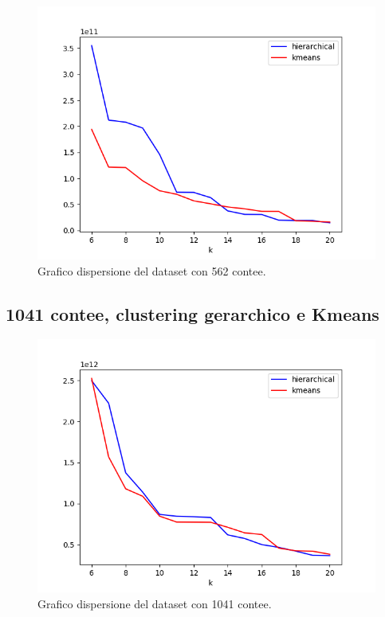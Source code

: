\documentclass{article}
\begin{document}
\begin{figure}[H]
	\hspace*{-1cm}\begin{minipage}{0.55\linewidth}
	\centering
	 
	\end{minipage}
	\begin{minipage}{0.7\linewidth}
		\includegraphics[width=1.0\linewidth, valign=t]{figures/output212}
		\caption*{Grafico dispersione del dataset con 562 contee.}
	\end{minipage}
\end{figure}
\subsection*{1041 contee, clustering gerarchico e Kmeans }
\begin{figure}[H]
	\hspace*{-1cm}\begin{minipage}{0.55\linewidth}
	\centering
	
	\end{minipage}
	\begin{minipage}{0.7\linewidth}
		\includegraphics[width=1.0\linewidth, valign=t]{figures/output1041}
		\caption*{Grafico dispersione del dataset con 1041 contee.}
										
	\end{minipage}
\end{figure}
\end{document}
